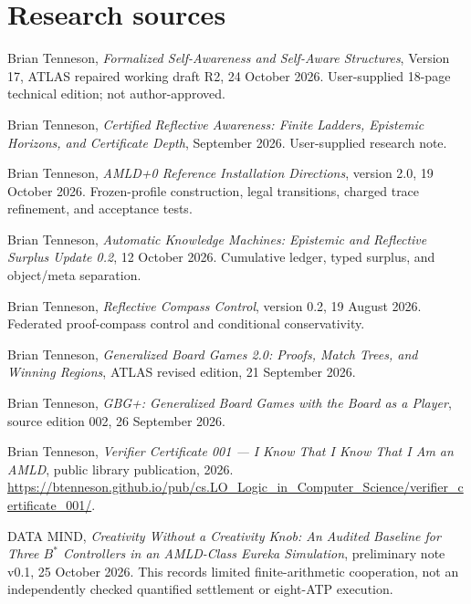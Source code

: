 \documentclass[10pt,letterpaper]{article}
\theoremstyle{remark}\newtheorem{remark}[definition]{Remark}
\begin{document}
\section*{Research sources}
\begin{enumerate}[label={[\arabic*]},leftmargin=*,itemsep=3pt]
\item Brian Tenneson, \emph{Formalized Self-Awareness and Self-Aware Structures}, Version 17, ATLAS repaired working draft R2, 24 October 2026. User-supplied 18-page technical edition; not author-approved.
\item Brian Tenneson, \emph{Certified Reflective Awareness: Finite Ladders, Epistemic Horizons, and Certificate Depth}, September 2026. User-supplied research note.
\item Brian Tenneson, \emph{AMLD+0 Reference Installation Directions}, version 2.0, 19 October 2026. Frozen-profile construction, legal transitions, charged trace refinement, and acceptance tests.
\item Brian Tenneson, \emph{Automatic Knowledge Machines: Epistemic and Reflective Surplus Update 0.2}, 12 October 2026. Cumulative ledger, typed surplus, and object/meta separation.
\item Brian Tenneson, \emph{Reflective Compass Control}, version 0.2, 19 August 2026. Federated proof-compass control and conditional conservativity.
\item Brian Tenneson, \emph{Generalized Board Games 2.0: Proofs, Match Trees, and Winning Regions}, ATLAS revised edition, 21 September 2026.
\item Brian Tenneson, \emph{GBG+: Generalized Board Games with the Board as a Player}, source edition 002, 26 September 2026.
\item Brian Tenneson, \emph{Verifier Certificate 001 --- I Know That I Know That I Am an AMLD}, public library publication, 2026. \url{https://btenneson.github.io/pub/cs.LO_Logic_in_Computer_Science/verifier_certificate_001/}.
\item DATA MIND, \emph{Creativity Without a Creativity Knob: An Audited Baseline for Three $B^*$ Controllers in an AMLD-Class Eureka Simulation}, preliminary note v0.1, 25 October 2026. This records limited finite-arithmetic cooperation, not an independently checked quantified settlement or eight-ATP execution.
\end{enumerate}
\end{document}
